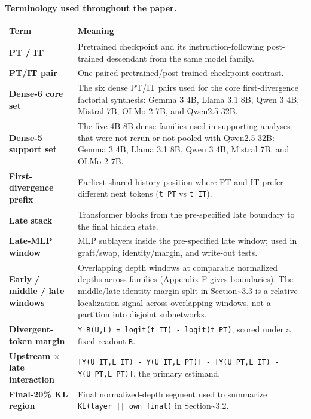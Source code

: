 \documentclass[11pt]{article}
\begin{document}
\textbf{Terminology used throughout the paper.}

\begin{table}[t]
\centering
\small
\setlength{\tabcolsep}{3pt}
\begin{tabularx}{\linewidth}{@{}>{\raggedright\arraybackslash}X >{\raggedright\arraybackslash}X@{}}
\toprule
Term & Meaning \\
\midrule
\textbf{PT / IT} & Pretrained checkpoint and its instruction-following post-trained descendant from the same model family. \\
\textbf{PT/IT pair} & One paired pretrained/post-trained checkpoint contrast. \\
\textbf{Dense-6 core set} & The six dense PT/IT pairs used for the core first-divergence factorial synthesis: Gemma 3 4B, Llama 3.1 8B, Qwen 3 4B, Mistral 7B, OLMo 2 7B, and Qwen2.5 32B. \\
\textbf{Dense-5 support set} & The five 4B-8B dense families used in supporting analyses that were not rerun or not pooled with Qwen2.5-32B: Gemma 3 4B, Llama 3.1 8B, Qwen 3 4B, Mistral 7B, and OLMo 2 7B. \\
\textbf{First-divergence prefix} & Earliest shared-history position where PT and IT prefer different next tokens (\texttt{t\_PT} vs \texttt{t\_IT}). \\
\textbf{Late stack} & Transformer blocks from the pre-specified late boundary to the final hidden state. \\
\textbf{Late-MLP window} & MLP sublayers inside the pre-specified late window; used in graft/swap, identity/margin, and write-out tests. \\
\textbf{Early / middle / late windows} & Overlapping depth windows at comparable normalized depths across families (Appendix F gives boundaries). The middle/late identity-margin split in Section\textasciitilde{}3.3 is a relative-localization signal across overlapping windows, not a partition into disjoint subnetworks. \\
\textbf{Divergent-token margin} & \texttt{Y\_R(U,L) = logit(t\_IT) - logit(t\_PT)}, scored under a fixed readout \texttt{R}. \\
\textbf{Upstream \ensuremath{\times} late interaction} & \texttt{[Y(U\_IT,L\_IT) - Y(U\_IT,L\_PT)] - [Y(U\_PT,L\_IT) - Y(U\_PT,L\_PT)]}, the primary estimand. \\
\textbf{Final-20\% KL region} & Final normalized-depth segment used to summarize \texttt{KL(layer || own final)} in Section\textasciitilde{}3.2. \\
\bottomrule
\end{tabularx}
\end{table}
\end{document}
